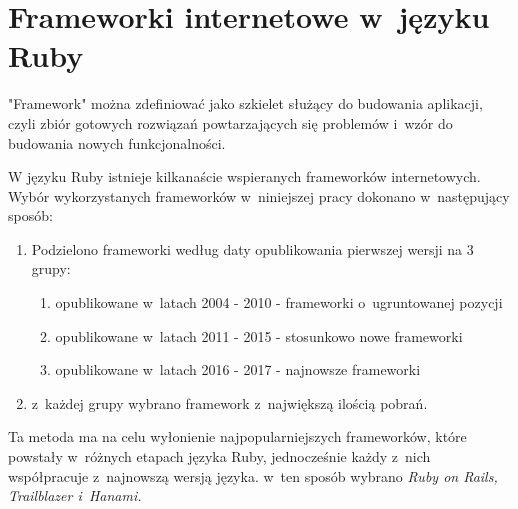 \documentclass[printmode]{mgr}
\begin{document}
\chapter{Frameworki internetowe w~języku Ruby}

"Framework" można zdefiniować jako szkielet służący do budowania aplikacji, czyli zbiór gotowych rozwiązań powtarzających się problemów i~wzór do budowania nowych funkcjonalności.\cite{framework}

W języku Ruby istnieje kilkanaście wspieranych frameworków internetowych. Wybór wykorzystanych frameworków w~niniejszej pracy dokonano w~następujący sposób:
  \begin{enumerate}
    \item Podzielono frameworki według daty opublikowania pierwszej wersji na 3 grupy:
    \begin{enumerate}
      \item opublikowane w~latach 2004 - 2010 - frameworki o~ugruntowanej pozycji
      \item opublikowane w~latach 2011 - 2015 - stosunkowo nowe frameworki
      \item opublikowane w~latach 2016 - 2017 - najnowsze frameworki
    \end{enumerate}
    \item z~każdej grupy wybrano framework z~największą ilością pobrań.
  \end{enumerate}
Ta metoda ma na celu wyłonienie najpopularniejszych frameworków, które powstały w~różnych etapach języka Ruby, jednocześnie każdy z~nich współpracuje z~najnowszą wersją języka. w~ten sposób wybrano \emph{Ruby on Rails, Trailblazer i~Hanami.}
\end{document}

